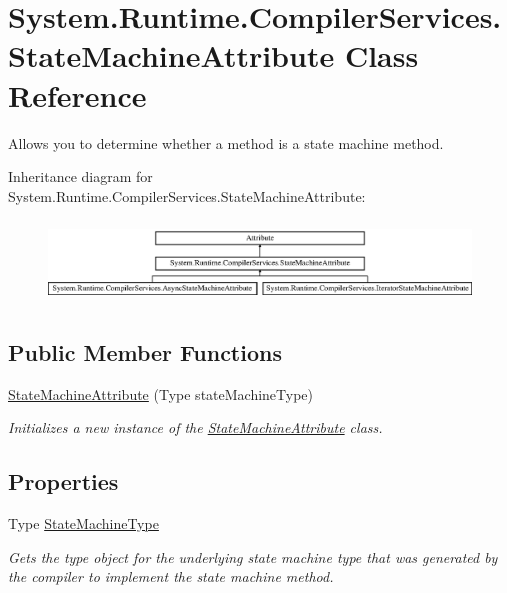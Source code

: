 \hypertarget{class_system_1_1_runtime_1_1_compiler_services_1_1_state_machine_attribute}{}\section{System.\+Runtime.\+Compiler\+Services.\+State\+Machine\+Attribute Class Reference}
\label{class_system_1_1_runtime_1_1_compiler_services_1_1_state_machine_attribute}


Allows you to determine whether a method is a state machine method.  


Inheritance diagram for System.\+Runtime.\+Compiler\+Services.\+State\+Machine\+Attribute\+:\begin{figure}[H]
\begin{center}
\leavevmode
\includegraphics[height=2.210526cm]{class_system_1_1_runtime_1_1_compiler_services_1_1_state_machine_attribute}
\end{center}
\end{figure}
\subsection*{Public Member Functions}
\begin{DoxyCompactItemize}
\item 
\hyperlink{class_system_1_1_runtime_1_1_compiler_services_1_1_state_machine_attribute_a0d0108f41448e96c8abdbccf24177fe8}{State\+Machine\+Attribute} (Type state\+Machine\+Type)
\begin{DoxyCompactList}\small\item\em Initializes a new instance of the \hyperlink{class_system_1_1_runtime_1_1_compiler_services_1_1_state_machine_attribute}{State\+Machine\+Attribute} class. \end{DoxyCompactList}\end{DoxyCompactItemize}
\subsection*{Properties}
\begin{DoxyCompactItemize}
\item 
Type \hyperlink{class_system_1_1_runtime_1_1_compiler_services_1_1_state_machine_attribute_a45802cb06f2be1ea63a8974e99ec4d7c}{State\+Machine\+Type}
\begin{DoxyCompactList}\small\item\em Gets the type object for the underlying state machine type that was generated by the compiler to implement the state machine method. \end{DoxyCompactList}\end{DoxyCompactItemize}


